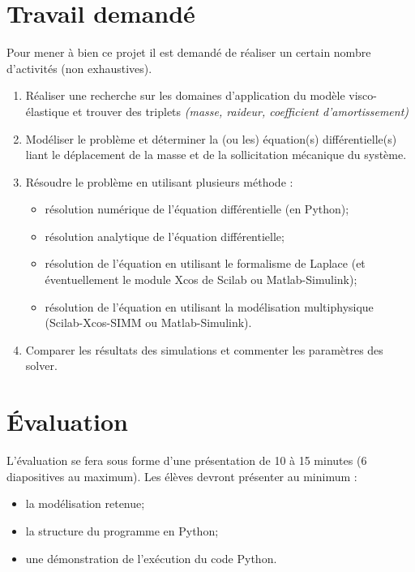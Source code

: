 \documentclass[10pt]{article}
\newif\ifprof
\begin{document}
\section{Travail demandé}
Pour mener à bien ce projet il est demandé de réaliser un certain nombre d'activités (non exhaustives).
\begin{enumerate}
\item Réaliser une recherche sur les domaines d'application du modèle visco-élastique et trouver des triplets \textit{(masse, raideur, coefficient d'amortissement)}
\item Modéliser le problème et déterminer la (ou les) équation(s) différentielle(s) liant le déplacement de la masse et de la sollicitation mécanique du système.
\item Résoudre le problème en utilisant plusieurs méthode : 
\begin{itemize}
\item résolution numérique de l'équation différentielle (en Python);
\item résolution analytique de l'équation différentielle;
\item résolution de l'équation en utilisant le formalisme de Laplace (et éventuellement le module Xcos de Scilab ou Matlab-Simulink);
\item résolution de l'équation en utilisant la modélisation multiphysique (Scilab-Xcos-SIMM ou Matlab-Simulink).
\end{itemize}
\item Comparer les résultats des simulations et commenter les paramètres des solver.
\end{enumerate}

\section{Évaluation}
L'évaluation se fera sous forme d'une présentation de 10 à 15 minutes (6 diapositives au maximum). Les élèves devront présenter au minimum : 
\begin{itemize}
\item la modélisation retenue;
\item la structure du programme en Python;
\item une démonstration de l'exécution du code Python.
\end{itemize}


\ifprof
\newpage

\setcounter{section}{0}
\begin{center}
\textsc\textbf{{Éléments de corrigé}}
\end{center}

\section{Mise en équation du problème}


\else
\fi
\end{document}
